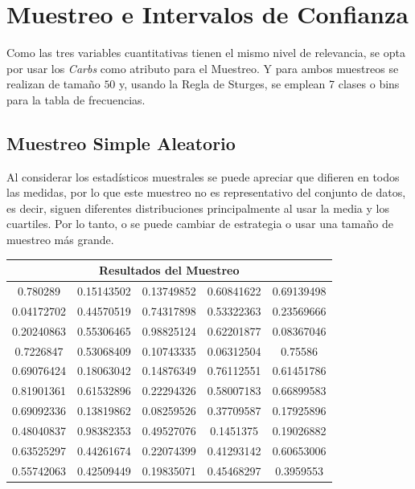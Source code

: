 \documentclass[12pt,a4paper]{article}
\begin{document}
    \newpage

    \section{Muestreo e Intervalos de Confianza}
    {
        Como las tres variables cuantitativas tienen el mismo nivel 
        de relevancia, se opta por usar los \emph{Carbs} como atributo 
        para el Muestreo. Y para ambos muestreos se realizan de 
        tamaño $50$ y, usando la Regla de Sturges, se emplean 7 clases 
        o bins para la tabla de frecuencias.

        \subsection{Muestreo Simple Aleatorio}\label{subsec:sample_rand}
        {
            Al considerar los estadísticos muestrales se puede 
            apreciar que difieren en todos las medidas, por lo que este muestreo 
            no es representativo del conjunto de datos, es decir, siguen diferentes 
            distribuciones principalmente al usar la media y los cuartiles. Por lo 
            tanto, o se puede cambiar de estrategia o usar una tamaño de muestreo 
            más grande.

            \begin{center}
                \begin{tabular}{ccccc}
                        \multicolumn{5}{c}{Resultados del Muestreo} \\ 
                    \midrule
                        0.780289 &   0.15143502 & 0.13749852 &  0.60841622 & 0.69139498 \\ 
                        0.04172702 & 0.44570519 & 0.74317898 & 0.53322363 & 0.23569666\\
                        0.20240863 & 0.55306465 & 0.98825124 &  0.62201877 & 0.08367046 \\ 
                        0.7226847 & 0.53068409 & 0.10743335 & 0.06312504 & 0.75586 \\
                        0.69076424 & 0.18063042 & 0.14876349 &  0.76112551 & 0.61451786 \\ 
                        0.81901361 & 0.61532896 & 0.22294326 & 0.58007183 & 0.66899583\\
                        0.69092336 & 0.13819862 & 0.08259526 &  0.37709587 & 0.17925896 \\ 
                        0.48040837 & 0.98382353 & 0.49527076 & 0.1451375 &  0.19026882\\
                        0.63525297 & 0.44261674 & 0.22074399 &  0.41293142 & 0.60653006 \\ 
                        0.55742063 & 0.42509449 & 0.19835071 & 0.45468297 & 0.3959553\\
                \end{tabular}
            \end{center}

}}
\end{document}
